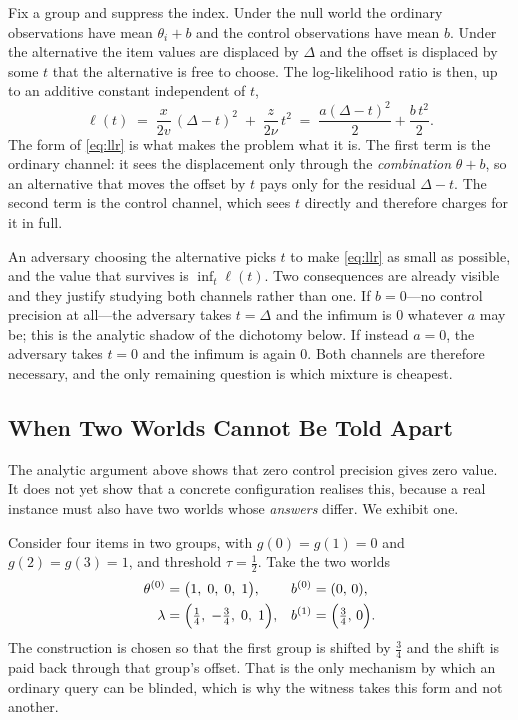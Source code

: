 \documentclass[conference]{IEEEtran}
\theoremstyle{definition}
\begin{document}
Fix a group and suppress the index. Under the null world the ordinary observations have mean
$\theta_{i}+b$ and the control observations have mean $b$. Under the alternative the item
values are displaced by $\Delta$ and the offset is displaced by some $t$ that the
alternative is free to choose. The log-likelihood ratio is then, up to an additive constant
independent of $t$,
\begin{equation}
\ell(t)\;=\;\frac{x}{2v}\,(\Delta-t)^{2}\;+\;\frac{z}{2\nu}\,t^{2}
        \;=\;\frac{a(\Delta-t)^{2}}{2}+\frac{b\,t^{2}}{2}.
\label{eq:llr}
\end{equation}
The form of \eqref{eq:llr} is what makes the problem what it is. The first term is the
ordinary channel: it sees the displacement only through the \emph{combination} $\theta+b$,
so an alternative that moves the offset by $t$ pays only for the residual $\Delta-t$. The
second term is the control channel, which sees $t$ directly and therefore charges for it in
full.

An adversary choosing the alternative picks $t$ to make \eqref{eq:llr} as small as possible,
and the value that survives is $\inf_{t}\ell(t)$. Two consequences are already visible and
they justify studying both channels rather than one. If $b=0$---no control precision at
all---the adversary takes $t=\Delta$ and the infimum is $0$ whatever $a$ may be; this is the
analytic shadow of the dichotomy below. If instead $a=0$, the adversary takes $t=0$ and the
infimum is again $0$. Both channels are therefore necessary, and the only remaining question
is which mixture is cheapest.

\subsection{When Two Worlds Cannot Be Told Apart}
\label{sec:dichotomy}

The analytic argument above shows that zero control precision gives zero value. It does not
yet show that a concrete configuration realises this, because a real instance must also have
two worlds whose \emph{answers} differ. We exhibit one.

Consider four items in two groups, with $g(0)=g(1)=0$ and $g(2)=g(3)=1$, and threshold
$\tau=\tfrac{1}{2}$. Take the two worlds
\begin{align}
\theta^{(0)} &= \bigl(1,\;0,\;0,\;1\bigr), & b^{(0)} &= (0,\,0),
\label{eq:world0}\\
\lambda &= \Bigl(\tfrac{1}{4},\;-\tfrac{3}{4},\;0,\;1\Bigr), & b^{(1)} &= \Bigl(\tfrac{3}{4},\,0\Bigr).
\label{eq:world1}
\end{align}
The construction is chosen so that the first group is shifted by $\tfrac34$ and the shift is
paid back through that group's offset. That is the only mechanism by which an ordinary query
can be blinded, which is why the witness takes this form and not another.
\end{document}
